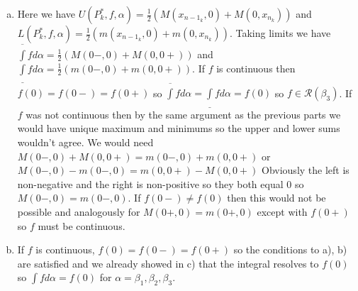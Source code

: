 \documentclass{article}
\begin{document}
\begin{enumerate}
\begin{enumerate}[(a)]
\item Here we have $U(P_{k}^*, f, \alpha) = \frac{1}{2}(M(x_{{n-1}_k}, 0) + M(0, x_{n_k}))$ and $L(P_{k}^*, f, \alpha) = \frac{1}{2}(m(x_{{n-1}_k}, 0) + m(0, x_{n_k}))$. Taking limits we have $\overline{\int}f d\alpha = \frac{1}{2} (M(0-, 0) + M(0, 0+))$ and $\underline{\int}f d\alpha = \frac{1}{2} (m(0-, 0) + m(0, 0+))$. If $f$ is continuous then $f(0) = f(0-) = f(0+)$ so $\overline{\int}f d\alpha = \underline{\int}f d\alpha = f(0)$ so $f\in\mathcal{R}(\beta_3)$. If $f$ was not continuous then by the same argument as the previous parts we would have unique maximum and minimums so the upper and lower sums wouldn't agree. We would need $M(0-, 0) + M(0, 0+) = m(0-, 0) + m(0, 0+)$ or $M(0-, 0) - m(0-, 0) = m(0, 0+) - M(0, 0+)$ Obviously the left is non-negative and the right is non-positive so they both equal $0$ so $M(0-, 0) = m(0-, 0)$. If $f(0-)\neq f(0)$ then this would not be possible and analogously for $M(0+, 0) = m(0+, 0)$ except with $f(0+)$ so $f$ must be continuous. \\
\item If $f$ is continuous, $f(0) = f(0-) = f(0+)$ so the conditions to a), b) are satisfied and we already showed in c) that the integral resolves to $f(0)$ so $\int f d\alpha = f(0)$ for $\alpha = \beta_1, \beta_2, \beta_3$. 
\end{enumerate}
\end{enumerate}
\end{document}
